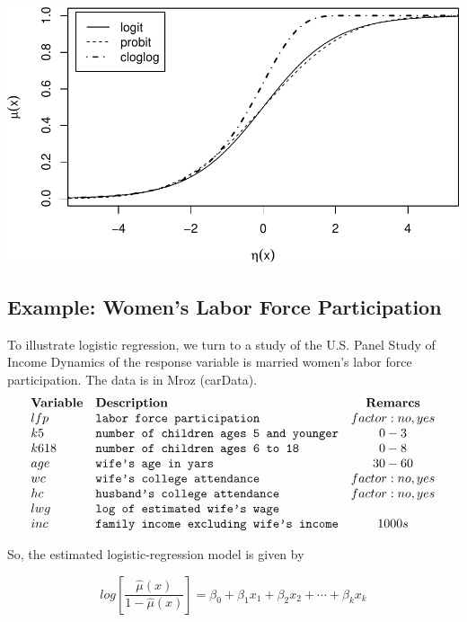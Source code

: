 \documentclass[
]{article}
\begin{document}
\includegraphics{LogisticRegressCh6_files/figure-latex/unnamed-chunk-2-1.pdf}

\hypertarget{example-womens-labor-force-participation}{%
\subsection{Example: Women's Labor Force
Participation}\label{example-womens-labor-force-participation}}

To illustrate logistic regression, we turn to a study of the U.S. Panel
Study of Income Dynamics of the response variable is married women's
labor force participation. The data is in Mroz (carData).
\[\begin{array}{llc}
  \bf{Variable} & {\bf Description} & {\bf Remarcs} \\
  lfp & \verb+labor force participation+ & factor: no, yes \\
  k5 & \verb+number of children ages 5 and younger+ & 0-3 \\
  k618 & \verb+number of children ages 6 to 18+ & 0-8\\
  age & \verb+wife's age in yars+ & 30-60 \\
  wc & \verb+wife's college attendance+ & factor: no, yes \\
  hc & \verb+husband's college attendance+ & factor: no, yes \\
  lwg & \verb+log of estimated wife's wage+ &  \\
  inc & \verb+family income excluding wife's income+ & 1000s
\end{array} \]

So, the estimated logistic-regression model is given by

\[log[\frac{\hat\mu(x)}{1-\hat\mu(x)}] = \beta_0 + \beta_1 x_1 + \beta_2 x_2 + \cdots + \beta_k x_k\]
\end{document}

